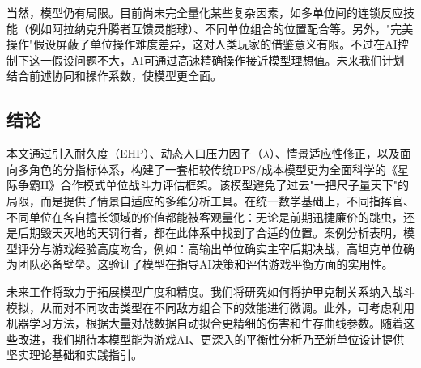 \documentclass[a4paper,12pt]{article}
\begin{document}
\begin{CJK}{UTF8}{gbsn}
当然，模型仍有局限。目前尚未完全量化某些复杂因素，如多单位间的连锁反应技能（例如阿拉纳克升腾者互馈灵能球）、不同单位组合的位置配合等。另外，"完美操作"假设屏蔽了单位操作难度差异，这对人类玩家的借鉴意义有限。不过在AI控制下这一假设问题不大，AI可通过高速精确操作接近模型理想值。未来我们计划结合前述协同和操作系数，使模型更全面。

\subsection{结论}
本文通过引入耐久度（EHP）、动态人口压力因子（$\lambda$）、情景适应性修正，以及面向多角色的分指标体系，构建了一套相较传统DPS/成本模型更为全面科学的《星际争霸II》合作模式单位战斗力评估框架。该模型避免了过去"一把尺子量天下"的局限，而是提供了情景自适应的多维分析工具。在统一数学基础上，不同指挥官、不同单位在各自擅长领域的价值都能被客观量化：无论是前期迅捷廉价的跳虫，还是后期毁天灭地的天罚行者，都在此体系中找到了合适的位置。案例分析表明，模型评分与游戏经验高度吻合，例如：高输出单位确实主宰后期决战，高坦克单位确为团队必备壁垒。这验证了模型在指导AI决策和评估游戏平衡方面的实用性。

未来工作将致力于拓展模型广度和精度。我们将研究如何将护甲克制关系纳入战斗模拟，从而对不同攻击类型在不同敌方组合下的效能进行微调。此外，可考虑利用机器学习方法，根据大量对战数据自动拟合更精细的伤害和生存曲线参数。随着这些改进，我们期待本模型能为游戏AI、更深入的平衡性分析乃至新单位设计提供坚实理论基础和实践指引。


\end{CJK}
\end{document}
